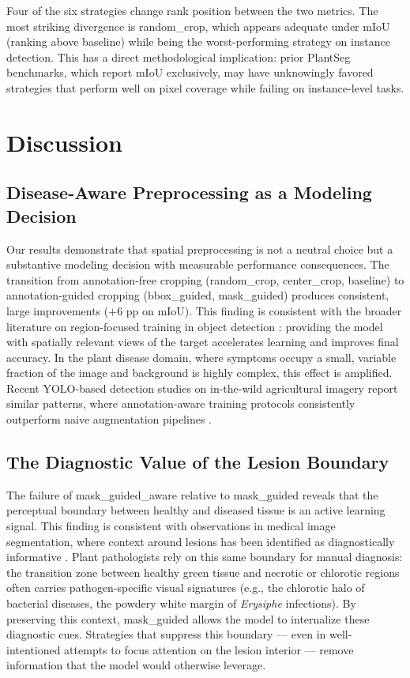 \documentclass[preprint,12pt]{elsarticle}
\begin{document}
Four of the six strategies change rank position between the two metrics. The most striking divergence is random\_crop, which appears adequate under mIoU (ranking above baseline) while being the worst-performing strategy on instance detection. This has a direct methodological implication: prior PlantSeg benchmarks, which report mIoU exclusively, may have unknowingly favored strategies that perform well on pixel coverage while failing on instance-level tasks.

\section{Discussion}
\label{sec:discussion}

\subsection{Disease-Aware Preprocessing as a Modeling Decision}
Our results demonstrate that spatial preprocessing is not a neutral choice but a substantive modeling decision with measurable performance consequences. The transition from annotation-free cropping (random\_crop, center\_crop, baseline) to annotation-guided cropping (bbox\_guided, mask\_guided) produces consistent, large improvements ($+$6 pp on mIoU). This finding is consistent with the broader literature on region-focused training in object detection \citep{zoph2020learning, cubuk2020randaugment}: providing the model with spatially relevant views of the target accelerates learning and improves final accuracy. In the plant disease domain, where symptoms occupy a small, variable fraction of the image and background is highly complex, this effect is amplified. Recent YOLO-based detection studies on in-the-wild agricultural imagery report similar patterns, where annotation-aware training protocols consistently outperform naive augmentation pipelines \citep{miao2025serpensgate}.

\subsection{The Diagnostic Value of the Lesion Boundary}
The failure of mask\_guided\_aware relative to mask\_guided reveals that the perceptual boundary between healthy and diseased tissue is an active learning signal. This finding is consistent with observations in medical image segmentation, where context around lesions has been identified as diagnostically informative \citep{chen2021transunet}. Plant pathologists rely on this same boundary for manual diagnosis: the transition zone between healthy green tissue and necrotic or chlorotic regions often carries pathogen-specific visual signatures (e.g., the chlorotic halo of bacterial diseases, the powdery white margin of \textit{Erysiphe} infections). By preserving this context, mask\_guided allows the model to internalize these diagnostic cues. Strategies that suppress this boundary --- even in well-intentioned attempts to focus attention on the lesion interior --- remove information that the model would otherwise leverage.
\end{document}
